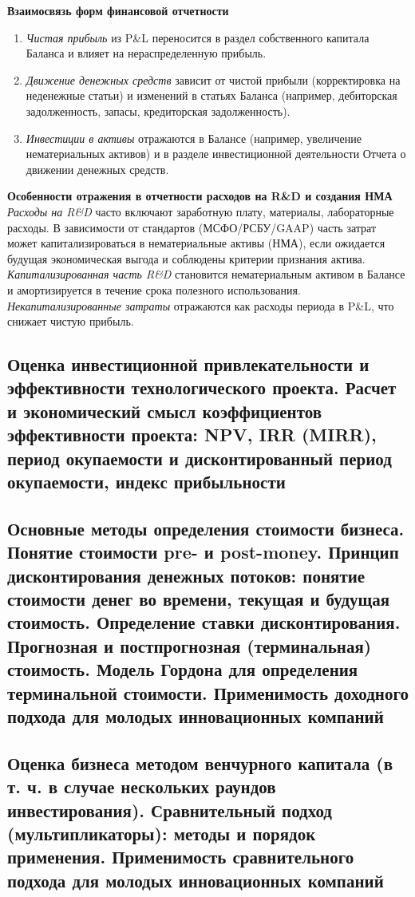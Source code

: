 \textbf{Взаимосвязь форм финансовой отчетности}

\begin{enumerate}
    \item \textit{Чистая прибыль} из P\&L переносится в раздел собственного капитала Баланса и влияет на нераспределенную прибыль.
    \item \textit{Движение денежных средств} зависит от чистой прибыли (корректировка на неденежные статьи) и изменений в статьях Баланса (например, дебиторская задолженность, запасы, кредиторская задолженность).
    \item \textit{Инвестиции в активы} отражаются в Балансе (например, увеличение нематериальных активов) и в разделе инвестиционной деятельности Отчета о движении денежных средств.
\end{enumerate}


\textbf{Особенности отражения в отчетности расходов на R\&D и создания НМА}
\textit{Расходы на R\&D} часто включают заработную плату, материалы, лабораторные расходы. В зависимости от стандартов (МСФО/РСБУ/GAAP) часть затрат может капитализироваться в нематериальные активы (НМА), если ожидается будущая экономическая выгода и соблюдены критерии признания актива.
\textit{Капитализированная часть R\&D} становится нематериальным активом в Балансе и амортизируется в течение срока полезного использования.
\textit{Некапитализированные затраты} отражаются как расходы периода в P\&L, что снижает чистую прибыль.









\subsection{Оценка инвестиционной привлекательности и эффективности технологического проекта. Расчет и экономический смысл коэффициентов эффективности проекта: NPV, IRR (MIRR), период окупаемости и дисконтированный период окупаемости, индекс прибыльности}

\subsection{Основные методы определения стоимости бизнеса. Понятие стоимости pre- и post-money. Принцип дисконтирования денежных потоков: понятие стоимости денег во времени, текущая и будущая стоимость. Определение ставки дисконтирования. Прогнозная и постпрогнозная (терминальная) стоимость. Модель Гордона для определения терминальной стоимости. Применимость доходного подхода для молодых инновационных компаний}

\subsection{Оценка бизнеса методом венчурного капитала (в т. ч. в случае нескольких раундов инвестирования). Сравнительный подход (мультипликаторы): методы и порядок применения. Применимость сравнительного подхода для молодых инновационных компаний}
